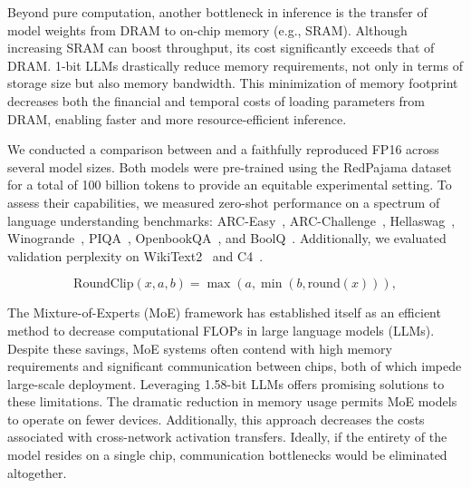 Beyond pure computation, another bottleneck in inference is the transfer of model weights from DRAM to on-chip memory (e.g., SRAM). Although increasing SRAM can boost throughput, its cost significantly exceeds that of DRAM. 1-bit LLMs drastically reduce memory requirements, not only in terms of storage size but also memory bandwidth. This minimization of memory footprint decreases both the financial and temporal costs of loading parameters from DRAM, enabling faster and more resource-efficient inference.

We conducted a comparison between  and a faithfully reproduced FP16  across several model sizes. Both models were pre-trained using the RedPajama dataset~\cite{redpajama} for a total of 100 billion tokens to provide an equitable experimental setting. To assess their capabilities, we measured zero-shot performance on a spectrum of language understanding benchmarks: ARC-Easy~\cite{arc}, ARC-Challenge~\cite{arc}, Hellaswag~\cite{hellaswag}, Winogrande~\cite{winoGrande}, PIQA~\cite{piqa}, OpenbookQA~\cite{openbookqa}, and BoolQ~\cite{boolq}. Additionally, we evaluated validation perplexity on WikiText2~\cite{wikitext2} and C4~\cite{c4}.

\begin{equation}
    \mathrm{RoundClip}(x, a, b) = \max(a, \min(b, \mathrm{round}(x))),
\end{equation}

The Mixture-of-Experts (MoE) framework has established itself as an efficient method to decrease computational FLOPs in large language models (LLMs). Despite these savings, MoE systems often contend with high memory requirements and significant communication between chips, both of which impede large-scale deployment. Leveraging 1.58-bit LLMs offers promising solutions to these limitations. The dramatic reduction in memory usage permits MoE models to operate on fewer devices. Additionally, this approach decreases the costs associated with cross-network activation transfers. Ideally, if the entirety of the model resides on a single chip, communication bottlenecks would be eliminated altogether.




